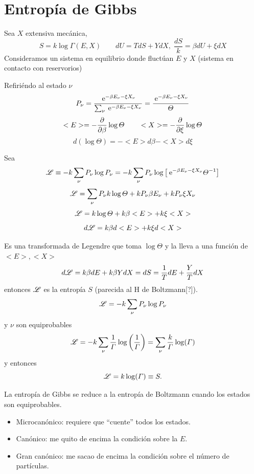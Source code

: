 \documentclass[10pt,oneside]{CBFT_book}
\begin{document}
\section{Entropía de Gibbs}

Sea $X$ extensiva mecánica,
\[
	S = k \log \Gamma (E,X) \qquad dU = TdS + Y dX, \; \frac{dS}{k} = \beta dU + \xi dX
\]
Consideramos un sistema en equilibrio donde fluctúan $E$ y $X$ (sistema en contacto con reservorios)

Refiriéndo al estado $ \nu $
\[
	P_\nu = \frac{ \:\mathrm{e}^{-\beta E_\nu - \xi X_\nu } }{ \sum_\nu \:\mathrm{e}^{-\beta E_\nu - \xi X_\nu } } =
	\frac{ \:\mathrm{e}^{-\beta E_\nu - \xi X_\nu }}{\Theta}
\]
\[
	<E> = -\frac{\partial^{\hspace{-0.05em}} {}}{\partial {\beta}^{\hspace{-0.05em}}} \log \Theta  \qquad <X> = -\frac{\partial^{\hspace{-0.05em}} {}}{\partial {\xi}^{\hspace{-0.05em}}} \log \Theta 
\]
\[
	d( \log \Theta ) = -<E> d\beta - <X> d\xi 
\]

Sea 
\[
	\mathscr{L} \equiv -k \sum_\nu P_\nu \log P_\nu =
	-k \sum_\nu P_\nu \log \left[ \:\mathrm{e}^{-\beta E_\nu - \xi X_\nu } \Theta^{-1} \right]
\]
\[
	\mathscr{L} = \sum_\nu P_\nu k \log \Theta + k P_\nu \beta E_\nu + k P_\nu \xi X_\nu
\]
\[
	\mathscr{L} = k\log \Theta + k\beta <E> + k\xi <X>
\]
\[
	d\mathscr{L} = k\beta d<E> + k\xi d<X>
\]

Es una transformada de Legendre que toma $\log \Theta$ y la lleva a una función de $ <E>, <X> $
\[
	d\mathscr{L} = k \beta dE + k \beta Y dX = dS = \frac{1}{T}dE + \frac{Y}{T} dX 
\]
entonces $\mathscr{L}$ es la entropía $S$ (parecida al H de Boltzmann[?]).
\[
	\mathscr{L} = -k \sum_\nu P_\nu \log P_\nu 
\]
y $\nu$ son equiprobables
\[
	\mathscr{L} = -k \sum_\nu \frac{1}{\Gamma} \log \left( \frac{1}{\Gamma} \right) = 
	\sum_\nu \frac{k}{\Gamma} \log(\Gamma)
\]
y entonces
\[
	\mathscr{L} = k \log( \Gamma ) \equiv S.
\]

La entropía de Gibbs se reduce a la entropía de Boltzmann cuando los estados son equiprobables.

\begin{itemize}
 \item Microcanónico: requiere que ``cuente'' todos los estados.
 \item Canónico: me quito de encima la condición sobre la $E$.
 \item Gran canónico: me sacao de encima la condición sobre el número de partículas.
\end{itemize}
\end{document}
